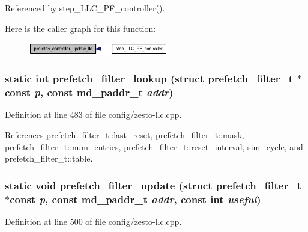 Referenced by step\_\-LLC\_\-PF\_\-controller().

Here is the caller graph for this function:\nopagebreak
\begin{figure}[H]
\begin{center}
\leavevmode
\includegraphics[width=173pt]{config_2zesto-llc_8cpp_2a67725e0ce33f38cea945ca6beef7d7_icgraph}
\end{center}
\end{figure}
\subsubsection[{prefetch\_\-filter\_\-lookup}]{\setlength{\rightskip}{0pt plus 5cm}static int prefetch\_\-filter\_\-lookup (struct {\bf prefetch\_\-filter\_\-t} $\ast$const  {\em p}, \/  const {\bf md\_\-paddr\_\-t} {\em addr})\hspace{0.3cm}{\tt  [static]}}\label{config_2zesto-llc_8cpp_17dbb4e8d2ae84f22541bef1c04253de}




Definition at line 483 of file config/zesto-llc.cpp.

References prefetch\_\-filter\_\-t::last\_\-reset, prefetch\_\-filter\_\-t::mask, prefetch\_\-filter\_\-t::num\_\-entries, prefetch\_\-filter\_\-t::reset\_\-interval, sim\_\-cycle, and prefetch\_\-filter\_\-t::table.
\subsubsection[{prefetch\_\-filter\_\-update}]{\setlength{\rightskip}{0pt plus 5cm}static void prefetch\_\-filter\_\-update (struct {\bf prefetch\_\-filter\_\-t} $\ast$const  {\em p}, \/  const {\bf md\_\-paddr\_\-t} {\em addr}, \/  const int {\em useful})\hspace{0.3cm}{\tt  [static]}}\label{config_2zesto-llc_8cpp_7867a082122e5a85b7e880d3bfb243f9}




Definition at line 500 of file config/zesto-llc.cpp.


